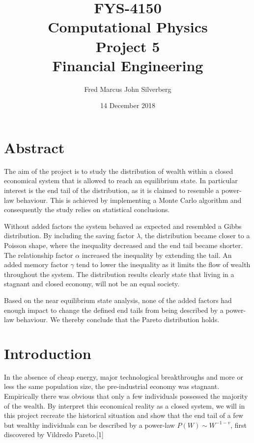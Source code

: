 \documentclass[a4paper,11pt]{article}
\begin{document}
%
   \title{FYS-4150\\Computational Physics\\Project 5\\Financial Engineering}
   \author{Fred Marcus John Silverberg} 
   \date{14 December 2018}
   \maketitle
\vspace{50px}
\section*{Abstract}
\setlength{\parindent}{0cm}
The aim of the project is to study the distribution of wealth within a closed economical system that is allowed to reach an equilibrium state. In particular interest is the end tail of the distribution, as it is claimed to resemble a power-law behaviour. This is achieved by implementing a Monte Carlo algorithm and consequently the study relies on statistical conclusions.
\\
\par

Without added factors the system behaved as expected and resembled a Gibbs distribution. By including the saving factor $\lambda$, the distribution became closer to a Poisson shape, where the inequality decreased and the end tail became shorter. The relationship factor $\alpha$ increased the inequality by extending the tail. An added memory factor $\gamma$ tend to lower the inequality as it limits the flow of wealth throughout the system. The distribution results clearly state that living in a stagnant and closed economy, will not be an equal society.
\\
\par
Based on the near equilibrium state analysis, none of the added factors had enough impact to change the defined end tails from being described by a power-law behaviour. We thereby conclude that the Pareto distribution holds.
\newpage
   \tableofcontents
\newpage
\section{Introduction}
\setlength{\parindent}{0cm}
In the absence of cheap energy, major technological breakthroughs and more or less the same population size, the pre-industrial economy was stagnant. Empirically there was obvious that only a few individuals possessed the majority of the wealth. By interpret this economical reality as a closed system, we will in this project recreate the historical situation and show that the end tail of a few but wealthy individuals can be described by a power-law $P(W) \sim W^{-1-v}$, first discovered by Vildredo Pareto.[1]
\\
\par
\end{document}
